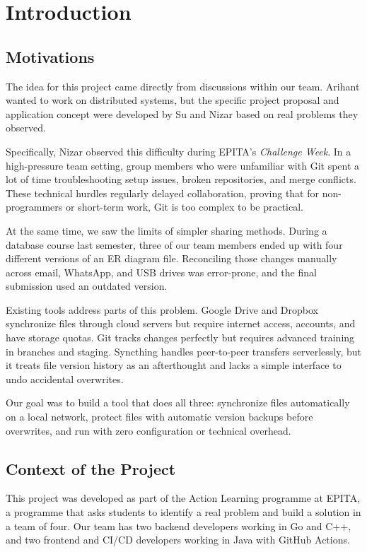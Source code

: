 \chapter{Introduction}

\section{Motivations}

The idea for this project came directly from discussions within our team. Arihant wanted to work on distributed systems, but the specific project proposal and application concept were developed by Su and Nizar based on real problems they observed. 

Specifically, Nizar observed this difficulty during EPITA's \emph{Challenge Week}. In a high-pressure team setting, group members who were unfamiliar with Git spent a lot of time troubleshooting setup issues, broken repositories, and merge conflicts. These technical hurdles regularly delayed collaboration, proving that for non-programmers or short-term work, Git is too complex to be practical.

At the same time, we saw the limits of simpler sharing methods. During a database course last semester, three of our team members ended up with four different versions of an ER diagram file. Reconciling those changes manually across email, WhatsApp, and USB drives was error-prone, and the final submission used an outdated version. 

Existing tools address parts of this problem. Google Drive \cite{googledrive} and Dropbox \cite{dropbox} synchronize files through cloud servers but require internet access, accounts, and have storage quotas. Git \cite{gitbook} tracks changes perfectly but requires advanced training in branches and staging. Syncthing \cite{syncthing} handles peer-to-peer transfers serverlessly, but it treats file version history as an afterthought and lacks a simple interface to undo accidental overwrites. 

Our goal was to build a tool that does all three: synchronize files automatically on a local network, protect files with automatic version backups before overwrites, and run with zero configuration or technical overhead.

\section{Context of the Project}

This project was developed as part of the Action Learning programme at EPITA, a programme that asks students to identify a real problem and build a solution in a team of four. Our team has two backend developers working in Go and C++, and two frontend and CI/CD developers working in Java with GitHub Actions.

